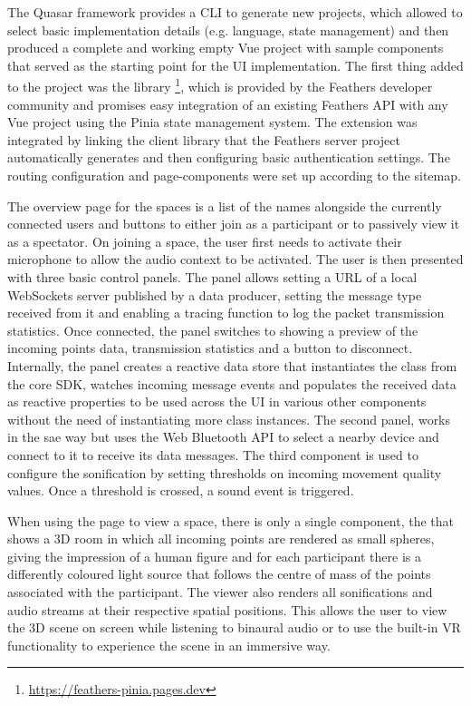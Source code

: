 The Quasar framework provides a \ac{CLI} to generate new projects, which allowed to select basic implementation details (e.g. language, state management) and then produced a complete and working empty Vue project with sample components that served as the starting point for the \ac{UI} implementation.
The first thing added to the project was the library \footnote{\url{https://feathers-pinia.pages.dev}}, which is provided by the Feathers developer community and promises easy integration of an existing Feathers \ac{API} with any Vue project using the Pinia state management system.
The extension was integrated by linking the client library that the Feathers server project automatically generates and then configuring basic authentication settings.
The routing configuration and page-components were set up according to the sitemap.

The overview page for the spaces is a list of the names alongside the currently connected users and buttons to either join as a participant or to passively view it as a spectator.
On joining a space, the user first needs to activate their microphone to allow the audio context to be activated.
The user is then presented with three basic control panels.
The  panel allows setting a URL of a local WebSockets server published by a data producer, setting the message type received from it and enabling a tracing function to log the packet transmission statistics.
Once connected, the panel switches to showing a preview of the incoming points data, transmission statistics and a button to disconnect.
Internally, the panel creates a reactive data store that instantiates the  class from the core \ac{SDK}, watches incoming message events and populates the received data as reactive properties to be used across the \ac{UI} in various other components without the need of instantiating more class instances.
The second panel,  works in the sae way but uses the Web Bluetooth \ac{API} to select a nearby device and connect to it to receive its data messages.
The third component is used to configure the sonification by setting thresholds on incoming movement quality values.
Once a threshold is crossed, a sound event is triggered.

When using the page to view a space, there is only a single component, the  that shows a \ac{3D} room in which all incoming points are rendered as small spheres, giving the impression of a human figure and for each participant there is a differently coloured light source that follows the centre of mass of the points associated with the participant.
The viewer also renders all sonifications and audio streams at their respective spatial positions.
This allows the user to view the \ac{3D} scene on screen while listening to binaural audio or to use the built-in \ac{VR} functionality to experience the scene in an immersive way.

